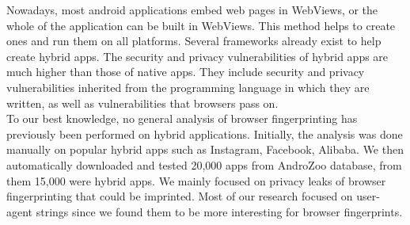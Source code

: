 Nowadays, most android applications embed web pages in WebViews, or the whole of the application can be built in WebViews. This method helps to create ones and run them on all platforms. Several frameworks already exist to help create hybrid apps. The security and privacy vulnerabilities of hybrid apps are much higher than those of native apps. They include security and privacy vulnerabilities inherited from the programming language in which they are written, as well as vulnerabilities that browsers pass on.  \\
 To our best knowledge, no general analysis of browser fingerprinting has previously been performed on hybrid applications. Initially, the analysis was done manually on popular hybrid apps such as Instagram, Facebook, Alibaba. We then automatically downloaded and tested 20,000 apps from AndroZoo database, from them  15,000 were hybrid apps. We mainly focused on privacy leaks of browser fingerprinting that could be imprinted. Most of our research focused on user-agent strings since we found them to be more interesting for browser fingerprints.

